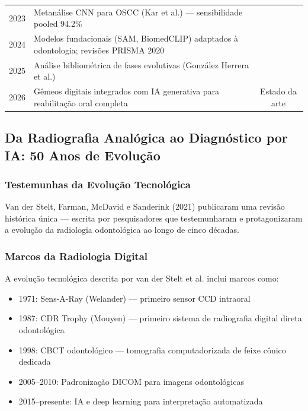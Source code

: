 \begin{table}[H]
\begin{tabularx}{\textwidth}{cXc}
    2023 & Metanálise CNN para OSCC (Kar et al.) — sensibilidade pooled 94.2\% & \cite{ODT-010} \\
    2024 & Modelos fundacionais (SAM, BiomedCLIP) adaptados à odontologia; revisões PRISMA 2020 & \cite{DL-ODT-017, DL-ODT-018} \\
    2025 & Análise bibliométrica de fases evolutivas (González Herrera et al.) & \cite{ODT-005} \\
    2026 & Gêmeos digitais integrados com IA generativa para reabilitação oral completa & Estado da arte \\
    \bottomrule
  \end{tabularx}
\end{table}

\subsection{Da Radiografia Analógica ao Diagnóstico por IA: 50 Anos de Evolução}

\subsubsection{Testemunhas da Evolução Tecnológica}

Van der Stelt, Farman, McDavid e Sanderink (2021) \cite{ODT-063} publicaram uma revisão histórica única — escrita por pesquisadores que testemunharam e protagonizaram a evolução da radiologia odontológica ao longo de cinco décadas.


\subsubsection{Marcos da Radiologia Digital}

A evolução tecnológica descrita por van der Stelt et al. inclui marcos como:

\begin{itemize}
    \item 1971: Sens-A-Ray (Welander) — primeiro sensor CCD intraoral
    \item 1987: CDR Trophy (Mouyen) — primeiro sistema de radiografia digital direta odontológica
    \item 1998: CBCT odontológico — tomografia computadorizada de feixe cônico dedicada
    \item 2005--2010: Padronização DICOM para imagens odontológicas
    \item 2015--presente: IA e deep learning para interpretação automatizada
\end{itemize}

